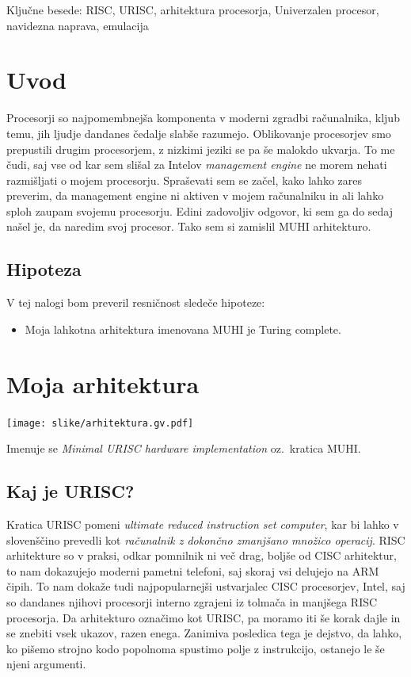 \documentclass[12pt]{article}
\begin{document}
Ključne besede: RISC, URISC, arhitektura procesorja, Univerzalen procesor, navidezna naprava, emulacija

\pagebreak


\section{Uvod}
Procesorji so najpomembnejša komponenta v moderni zgradbi računalnika, kljub temu, jih ljudje dandanes čedalje slabše razumejo.
Oblikovanje procesorjev smo prepustili drugim procesorjem, z nizkimi jeziki se pa še malokdo ukvarja.
To me čudi, saj vse od kar sem slišal za Intelov \textit{management engine} ne morem nehati razmišljati o mojem procesorju.
Spraševati sem se začel, kako lahko zares preverim, da management engine ni aktiven v mojem računalniku in ali lahko sploh zaupam svojemu procesorju.
Edini zadovoljiv odgovor, ki sem ga do sedaj našel je, da naredim svoj procesor.
Tako sem si zamislil MUHI arhitekturo.

\subsection{Hipoteza}
V tej nalogi bom preveril resničnost sledeče hipoteze:
\begin{itemize}
  \item Moja lahkotna arhitektura imenovana MUHI je Turing complete.
\end{itemize}

\section{Moja arhitektura}
\begin{center}
  \texttt{[image: slike/arhitektura.gv.pdf]}
\end{center}
Imenuje se \textit{Minimal URISC hardware implementation} oz.\ kratica MUHI.\@
\subsection{Kaj je URISC?}
Kratica URISC pomeni \textit{ultimate reduced instruction set computer}, kar bi lahko v slovenščino prevedli kot \textit{računalnik z dokončno zmanjšano množico operacij}.
RISC arhitekture so v praksi, odkar pomnilnik ni več drag, boljše od CISC arhitektur, to nam dokazujejo moderni pametni telefoni, saj skoraj vsi delujejo na ARM čipih.
To nam dokaže tudi najpopularnejši ustvarjalec CISC procesorjev, Intel, saj so dandanes njihovi procesorji interno zgrajeni iz tolmača in manjšega RISC procesorja.
Da arhitekturo označimo kot URISC, pa moramo iti še korak dajle in se znebiti vsek ukazov, razen enega.
Zanimiva posledica tega je dejstvo, da lahko, ko pišemo strojno kodo popolnoma spustimo polje z instrukcijo, ostanejo le še njeni argumenti.
\end{document}
